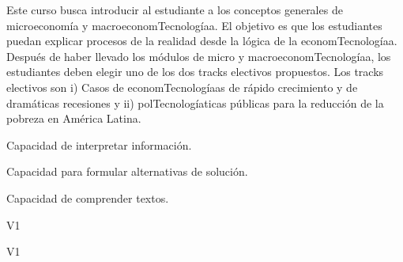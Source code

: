\begin{syllabus}


\begin{justification}
Este curso busca introducir al estudiante a los conceptos generales de microeconomía y macroeconomTecnologíaa. El objetivo es que los estudiantes puedan explicar procesos de la realidad desde la lógica de la economTecnologíaa. Después de haber llevado los módulos de micro y macroeconomTecnologíaa, los estudiantes deben elegir uno de los dos tracks electivos propuestos.
Los tracks electivos son i) Casos de economTecnologíaas de rápido crecimiento y de dramáticas recesiones y ii) polTecnologíaticas públicas para la reducción de la pobreza en América Latina.
\end{justification}

\begin{goals}
\item Capacidad de interpretar información.
\item Capacidad para formular alternativas de solución.
\item Capacidad de comprender textos.
\end{goals}

\begin{outcomes}{V1}
    \item {} %
    \item {} %
    \item {} %
    \item {} %

\end{outcomes}

\begin{competences}{V1}
    \item {}
    \item {}
    \item {}
    \item {}
\end{competences}


\end{syllabus}
